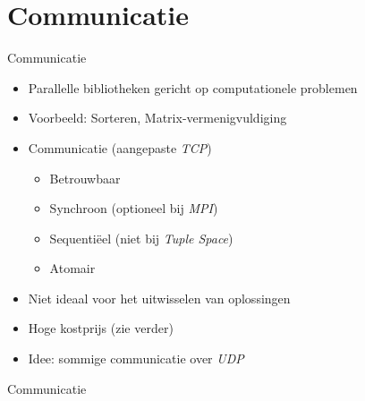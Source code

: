 \documentclass{beamer}
\begin{document}
\section{Communicatie}
\begin{frame}{Communicatie}
\begin{itemize}[<+->]
 \item Parallelle bibliotheken gericht op computationele problemen
 \item Voorbeeld: Sorteren, Matrix-vermenigvuldiging
 \item Communicatie (aangepaste \emph{TCP})
 \begin{itemize}[<+->]
  \item Betrouwbaar
  \item Synchroon (optioneel bij \emph{MPI})
  \item Sequenti\"eel (niet bij \emph{Tuple Space})
  \item Atomair
 \end{itemize}
 \item Niet ideaal voor het uitwisselen van oplossingen
 \item Hoge kostprijs (zie verder)
 \item Idee: sommige communicatie over \emph{UDP}
\end{itemize}
\end{frame}
\begin{frame}{Communicatie}
\end{frame}
\end{document}
